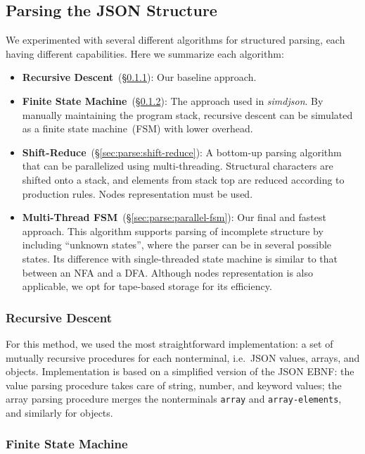 \documentclass[11pt]{article}
\begin{document}
\subsection{Parsing the JSON Structure}
We experimented with several different algorithms for structured parsing, each having different capabilities. Here we summarize each algorithm:
\begin{itemize}
  \item \textbf{Recursive Descent}~(\S\ref{sec:parse:recursive-descent}): Our baseline approach.
  \item \textbf{Finite State Machine}~(\S\ref{sec:parse:fsm}): The approach used in \textit{simdjson}. By manually maintaining the program stack, recursive descent can be simulated as a finite state machine~(FSM) with lower overhead.
  \item \textbf{Shift-Reduce}~(\S\ref{sec:parse:shift-reduce}): A bottom-up parsing algorithm that can be parallelized using multi-threading. Structural characters are shifted onto a stack, and elements from stack top are reduced according to production rules. Nodes representation must be used.
  \item \textbf{Multi-Thread FSM}~(\S\ref{sec:parse:parallel-fsm}): Our final and fastest approach. This algorithm supports parsing of incomplete structure by including ``unknown states'', where the parser can be in several possible states. Its difference with single-threaded state machine is similar to that between an NFA and a DFA. Although nodes representation is also applicable, we opt for tape-based storage for its efficiency.
\end{itemize}

\subsubsection{Recursive Descent}
\label{sec:parse:recursive-descent}

For this method, we used the most straightforward implementation: a set of mutually recursive procedures for each nonterminal, i.e.\ JSON values, arrays, and objects. Implementation is based on a simplified version of the JSON EBNF: the value parsing procedure takes care of string, number, and keyword values; the array parsing procedure merges the nonterminals \texttt{array} and \texttt{array-elements}, and similarly for objects.

\subsubsection{Finite State Machine}
\label{sec:parse:fsm}
\end{document}
